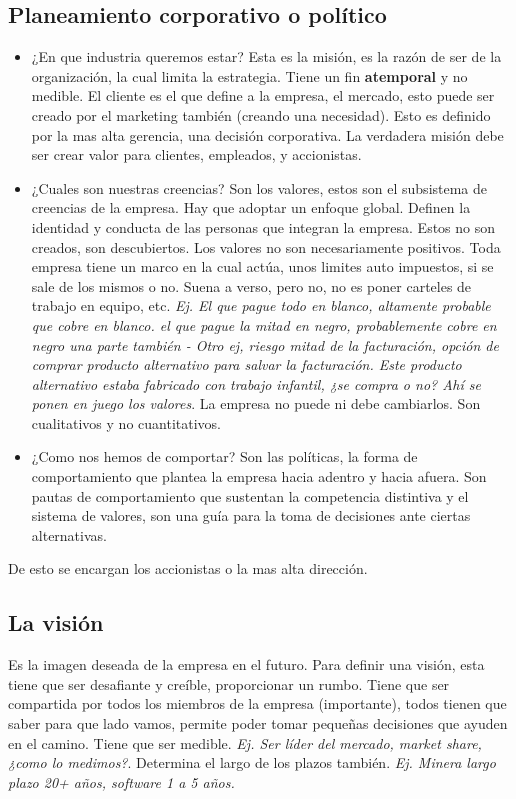 \documentclass[titlepage,a4paper]{article}
\begin{document}
\subsection{Planeamiento corporativo o político}
\begin{itemize}
    \item ¿En que industria queremos estar? Esta es la misión, es la razón de ser de la organización, la cual limita la estrategia. Tiene un fin \textbf{atemporal} y no medible. El cliente es el que define a la empresa, el mercado, esto puede ser creado por el marketing también (creando una necesidad). Esto es definido por la mas alta gerencia, una decisión corporativa. La verdadera misión debe ser crear valor para clientes, empleados, y accionistas.
    
    \item ¿Cuales son nuestras creencias? Son los valores, estos son el subsistema de creencias de la empresa. Hay que adoptar un enfoque global. Definen la identidad y conducta de las personas que integran la empresa. Estos no son creados, son descubiertos. Los valores no son necesariamente positivos. Toda empresa tiene un marco en la cual actúa, unos limites auto impuestos, si se sale de los mismos o no. Suena a verso, pero no, no es poner carteles de trabajo en equipo, etc. \textit{Ej. El que pague todo en blanco, altamente probable que cobre en blanco. el que pague la mitad en negro, probablemente cobre en negro una parte también - Otro ej, riesgo mitad de la facturación, opción de comprar producto alternativo para salvar la facturación. Este producto alternativo estaba fabricado con trabajo infantil, ¿se compra o no? Ahí se ponen en juego los valores}. La empresa no puede ni debe cambiarlos. Son cualitativos y no cuantitativos.
    
    \item ¿Como nos hemos de comportar? Son las políticas, la forma de comportamiento que plantea la empresa hacia adentro y hacia afuera. Son pautas de comportamiento que sustentan la competencia distintiva y el sistema de valores, son una guía para la toma de decisiones ante ciertas alternativas. 
\end{itemize}

De esto se encargan los accionistas o la mas alta dirección.

\subsection{La visión}
Es la imagen deseada de la empresa en el futuro. Para definir una visión, esta tiene que ser desafiante y creíble, proporcionar un rumbo. Tiene que ser compartida por todos los miembros de la empresa (importante), todos tienen que saber para que lado vamos, permite poder tomar pequeñas decisiones que ayuden en el camino. Tiene que ser medible. \textit{Ej. Ser líder del mercado, market share, ¿como lo medimos?}. Determina el largo de los plazos también. \textit{Ej. Minera largo plazo 20+ años, software 1 a 5 años.}
\end{document}
